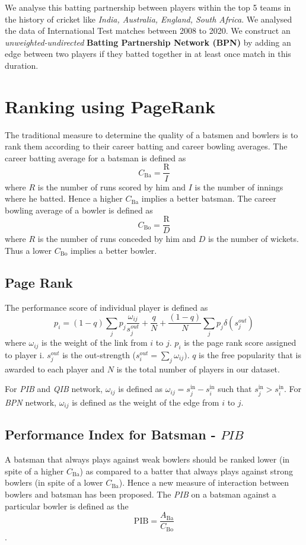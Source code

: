 \documentclass{article}
\begin{document}
We analyse this batting partnership between players within the top 5 teams in the history of cricket like \textit{India, Australia, England, South Africa}. We analysed the data of International Test matches between 2008 to 2020. We construct an \textit{unweighted-undirected} \textbf{Batting Partnership Network (BPN)} by adding an edge between two players if they batted together in at least once match in this duration.

\section{Ranking using PageRank}
The traditional measure to determine the quality of a batsmen and bowlers is to rank them according to their career batting and career bowling averages. The career batting average for a batsman is defined as $$C_{\mathrm{Ba}} = \frac{\mathrm{R}}{I}$$ where $R$ is the number of runs scored by him and $I$ is the number of innings where he batted. Hence a higher $C_{\mathrm{Ba}}$ implies a better batsman. The career bowling average of a bowler is defined as $$C_{\mathrm{Bo}} = \frac{\mathrm{R}}{D}$$ where $R$ is the number of runs conceded by him and $D$ is the number of wickets. Thus a lower $C_{\mathrm{Bo}}$ implies a better bowler.

\subsection{Page Rank}
The performance score of individual player is defined as $$p_i = (1 - q)\sum_{j}p_j\frac{\omega_{ij}}{s_j^{out}} + \frac{q}{N} + \frac{(1 - q)}{N}\sum_{j}p_j\delta(s_j^{out})$$
where $\omega_{ij}$ is the weight of the link from $i$ to $j$. $p_i$ is the page rank score assigned to player i. $s_j^{out}$ is the out-strength ($s^{out}_{i} = \sum_{j}\omega_{ij})$. $q$ is the free popularity that is awarded to each player and $N$ is the total number of players in our dataset. 

For \textit{PIB} and \textit{QIB} network, $\omega_{ij}$ is defined as $\omega_{ij} = s_j^{\mathrm{in}} - s_i^{\mathrm{in}}$ such that $s_j^{\mathrm{in}} > s_i^{\mathrm{in}}$. For \textit{BPN} network, $\omega _{ij}$ is defined as the weight of the edge from $i$ to $j$.

\subsection{Performance Index for Batsman - $PIB$}
A batsman that always plays against weak bowlers should be ranked lower (in spite of a higher $C_{\mathrm{Ba}}$) as compared to a batter that always plays against strong bowlers (in spite of a lower $C_{\mathrm{Ba}}$). Hence a new measure of interaction between bowlers and batsman has been proposed. The \textit{PIB} on a batsman against a particular bowler is defined as the $$\mathrm{PIB} = \frac{A_{\mathrm{Ba}}}{C_{\mathrm{Bo}}}$$.
\end{document}
